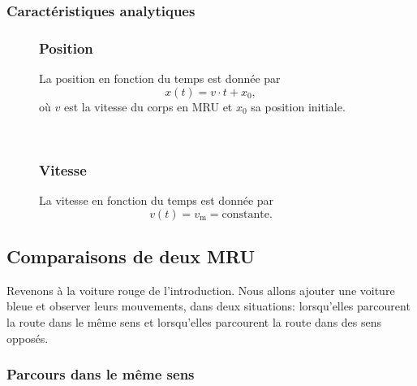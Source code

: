 \documentclass[
  a4paper,
  DIV=11,
  numbers=noendperiod,
  sans]{scrartcl}
\theoremstyle{definition}
\theoremstyle{definition}
\theoremstyle{remark}
\begin{document}
\begin{figure}
\end{figure}%

\subsubsection{Caractéristiques
analytiques}\label{caractuxe9ristiques-analytiques}

\begin{figure}

\begin{minipage}{0.48\linewidth}

\subsubsection{Position}\label{position-1}

La position en fonction du temps est donnée par \[
x(t)=v\cdot t+x_0,
\] où \(v\) est la vitesse du corps en MRU et \(x_0\) sa position
initiale.\end{minipage}%
%
\begin{minipage}{0.04\linewidth}
~\end{minipage}%
%
\begin{minipage}{0.48\linewidth}

\subsubsection{Vitesse}\label{vitesse-1}

La vitesse en fonction du temps est donnée par \[
v(t)=v_{\text{m}}=\text{constante}. 
\]\end{minipage}%

\end{figure}%

\newpage{}

\subsection{Comparaisons de deux MRU}\label{comparaisons-de-deux-mru}

Revenons à la voiture rouge de l'introduction. Nous allons ajouter une
voiture bleue et observer leurs mouvements, dans deux situations:
lorsqu'elles parcourent la route dans le même sens et lorsqu'elles
parcourent la route dans des sens opposés.

\subsubsection{Parcours dans le même
sens}\label{parcours-dans-le-muxeame-sens}
\end{document}
